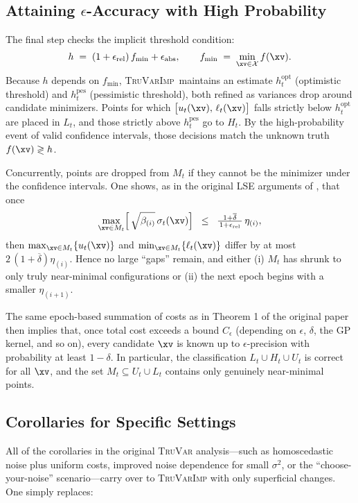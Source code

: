 \documentclass[a4paper,10pt]{article}
\newcommand{\TruVar}{\textsc{TruVar}\xspace}
\newcommand{\TruVarImp}{\textsc{TruVarImp}\xspace}
\newcommand{\deltabar}{\overline{\delta}}
\newcommand{\cset}{\mathcal{X}}
\begin{document}
\subsection{Attaining $\epsilon$-Accuracy with High Probability}

The final step checks the implicit threshold condition:
\[
   h
   \;=\;
   (1 + \epsilon_{\mathrm{rel}})\,f_{\min} + \epsilon_{\mathrm{abs}},
   \qquad
   f_{\min} \;=\; \min_{\xv \in \cset} f(\xv).
\]
Because $h$ depends on $f_{\min}$, \TruVarImp\ maintains an estimate $h_t^\mathrm{opt}$ (optimistic threshold) and $h_t^\mathrm{pes}$ (pessimistic threshold), both refined as variances drop around candidate minimizers.
Points for which $\bigl[u_t(\xv),\, \ell_t(\xv)\bigr]$ falls strictly below $h_t^\mathrm{opt}$ are placed in $L_t$, and those strictly above $h_t^\mathrm{pes}$ go to $H_t$.
By the high-probability event of valid confidence intervals, those decisions match the unknown truth $f(\xv)\gtrless h$.

Concurrently, points are dropped from $M_t$ if they cannot be the minimizer under the confidence intervals.
One shows, as in the original LSE arguments of \citet{Got13}, that once
\[
  \max_{\xv\in M_t}
  \Bigl[\,
    \sqrt{\beta_{(i)}}\,\sigma_t(\xv)
  \Bigr]
  \;\;\le\;\;
  \tfrac{1+\deltabar}{\,1+\epsilon_{\mathrm{rel}}\,}\,\eta_{(i)},
\]
then $\max_{\xv\in M_t}\{u_t(\xv)\}$ and $\min_{\xv\in M_t}\{\ell_t(\xv)\}$ differ by at most $2\,(1+\deltabar)\eta_{(i)}$.
Hence no large “gaps” remain, and either (i) $M_t$ has shrunk to only truly near-minimal configurations or (ii) the next epoch begins with a smaller $\eta_{(i+1)}$.

The same epoch-based summation of costs as in Theorem 1 of the original paper then implies that, once total cost exceeds a bound $C_{\epsilon}$ (depending on $\epsilon$, $\delta$, the GP kernel, and so on), every candidate $\xv$ is known up to $\epsilon$-precision with probability at least $1-\delta$.
In particular, the classification $L_t\cup H_t\cup U_t$ is correct for all $\xv$, and the set $M_t\subseteq U_t\cup L_t$ contains only genuinely near-minimal points.

\subsection{Corollaries for Specific Settings}

All of the corollaries in the original \TruVar analysis—such as homoscedastic noise plus uniform costs, improved noise dependence for small $\sigma^2$, or the “choose-your-noise” scenario—carry over to \TruVarImp with only superficial changes.
One simply replaces:
\end{document}
